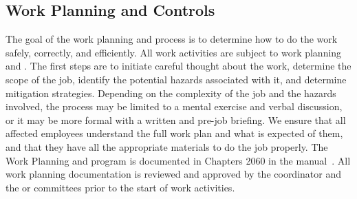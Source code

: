\subsection{Work Planning and Controls}

\begin{comment} Anne reworking
The goal of the work planning and \dword{ha} process is to
initiate careful thought about the hazards associated with work and
how the work can be performed safely. Careful planning of a job assures that
it is performed efficiently and safely. Work planning ensures the
scope of the job is understood, appropriate materials are available,
all hazards have been identified, mitigation efforts have been established, and
all affected employees understand what is expected of them. \dword{ha}
 is a critical part of work planning. All work activities
are subject to work planning and \dword{ha}. Depending on
the complexity of the task and the hazards involved, the \dword{ha} process
may be a mental exercise and verbal discussion, or it may be more
formal with a written hazard analysis and pre-job briefing. The Work
Planning and \dword{ha} program is documented in Chapters 2060 in
the \dword{feshm}. All work planning documentation is reviewed and
approved by \dword{dune} \dword{esh} coordinator and the \dword{dune}
\dword{irr} or \dword{orr} committees prior to the start of work activities.
\end{comment}

The goal of the work planning and  process is to determine how to do
the work safely, correctly, and efficiently. All work activities
are subject to work planning and . 
The first steps are to 
initiate careful thought about the work, determine the scope of the job, identify the potential hazards associated with it, and determine mitigation strategies.
Depending on the complexity of the job and the hazards involved, the  process
may be limited to a mental exercise and verbal discussion, or it may be more
formal with a written  and pre-job briefing.
We ensure that all affected employees understand the full work plan and what is expected of them, and that they have all the appropriate materials to do the job properly.
The Work Planning and  program is documented in Chapters 2060 in the  manual~\cite{feshm}. All work planning documentation is reviewed and
approved by the   coordinator and the 
 or  committees prior to the start of work activities.


